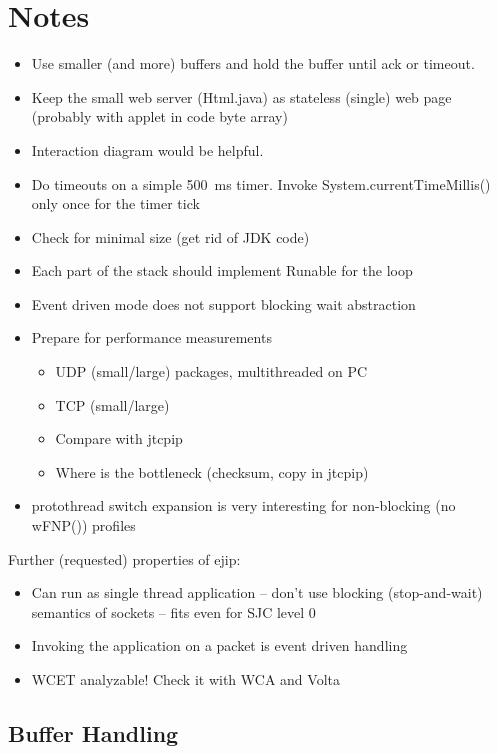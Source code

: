 \section{Notes}

\begin{itemize}
    \item Use smaller (and more) buffers and hold the buffer until
    ack or timeout.
    \item Keep the small web server (Html.java) as stateless (single) web
    page (probably with applet in code byte array)
    \item Interaction diagram would be helpful.
    \item Do timeouts on a simple 500~ms timer. Invoke
    System.currentTimeMillis() only once for the timer tick
    \item Check for minimal size (get rid of JDK code)
    \item Each part of the stack should implement Runable for the
    loop
    \item Event driven mode does not support blocking wait
    abstraction
    \item Prepare for performance measurements
    \begin{itemize}
        \item UDP (small/large) packages, multithreaded on PC
        \item TCP (small/large)
        \item Compare with jtcpip
        \item Where is the bottleneck (checksum, copy in jtcpip)
    \end{itemize}
    \item protothread switch expansion is very interesting for
    non-blocking (no wFNP()) profiles
\end{itemize}

Further (requested) properties of ejip:
\begin{itemize}
    \item Can run as single thread application -- don't use blocking
    (stop-and-wait) semantics of sockets -- fits even for SJC level
    0
    \item Invoking the application on a packet is event driven
    handling
    \item WCET analyzable! Check it with WCA and Volta
\end{itemize}

\subsection{Buffer Handling}

